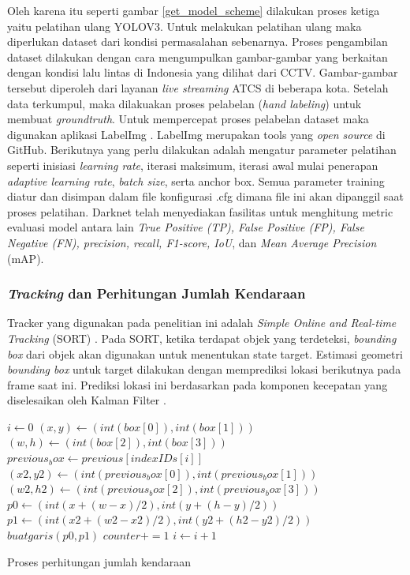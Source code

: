 \documentclass[conference]{IEEEtran}
\begin{document}
Oleh karena itu seperti gambar \ref{get_model_scheme} dilakukan proses ketiga yaitu pelatihan ulang YOLOV3. Untuk melakukan pelatihan ulang maka diperlukan dataset dari kondisi permasalahan sebenarnya. Proses pengambilan dataset dilakukan dengan cara mengumpulkan gambar-gambar yang berkaitan dengan kondisi lalu lintas di Indonesia yang dilihat dari CCTV. Gambar-gambar tersebut diperoleh dari layanan \textit{live streaming} ATCS di beberapa kota. 
Setelah data terkumpul, maka dilakuakan proses pelabelan (\textit{hand labeling}) untuk membuat \textit{groundtruth}. Untuk mempercepat proses pelabelan dataset maka digunakan aplikasi LabelImg \cite{LabelImg}. LabelImg merupakan tools yang \textit{open source} di GitHub. Berikutnya yang perlu dilakukan adalah mengatur parameter pelatihan seperti inisiasi \textit{learning rate}, iterasi maksimum, iterasi awal mulai penerapan \textit{adaptive learning rate}, \textit{batch size}, serta anchor box. Semua parameter training diatur dan disimpan dalam file konfigurasi .cfg dimana file ini akan 
dipanggil saat proses pelatihan. Darknet telah menyediakan fasilitas untuk menghitung metric evaluasi model antara lain \textit{True Positive (TP), False Positive (FP), False Negative (FN), precision, recall, F1-score, IoU}, dan \textit{Mean Average Precision} (mAP).

\subsubsection{\textit{Tracking} dan Perhitungan Jumlah Kendaraan}
Tracker yang digunakan pada penelitian ini adalah \textit{Simple Online and Real-time Tracking} (SORT) \cite{SORT}. Pada SORT, ketika terdapat objek yang terdeteksi, \textit{bounding box} dari objek akan digunakan untuk menentukan state target. Estimasi geometri \textit{bounding box} untuk target dilakukan dengan memprediksi lokasi berikutnya pada frame saat ini. Prediksi lokasi ini berdasarkan pada komponen kecepatan yang diselesaikan oleh Kalman Filter \cite{Kalman}.
\begin{algorithm}[htp]
	\begin{algorithmic}[1]
			\State $i \leftarrow 0$
				\State $(x, y) \leftarrow (int(box[0]), int(box[1]))$
				\State $(w, h) \leftarrow (int(box[2]), int(box[3]))$
					\State $previous_box \leftarrow previous[indexIDs[i]]$
					\State $(x2, y2) \leftarrow (int(previous_box[0]), int(previous_box[1]))$
					\State $(w2, h2) \leftarrow (int(previous_box[2]), int(previous_box[3]))$
					\State $p0 \leftarrow (int(x + (w-x)/2), int(y + (h-y)/2))$
					\State $p1 \leftarrow (int(x2 + (w2-x2)/2), int(y2 + (h2-y2)/2))$
					\State $buat garis (p0, p1)$
						\State $counter += 1$
					\EndIf
				\EndIf
				\State $i \leftarrow i+1$
			\EndFor
		\EndIf
	\end{algorithmic}
	\caption{Proses perhitungan jumlah kendaraan}
	\label{counting_ob}
\end{algorithm}
\end{document}
